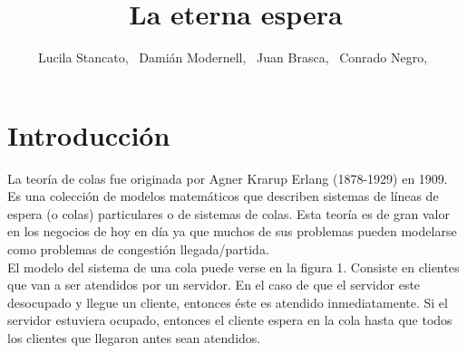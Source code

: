 \documentclass[10pt,journal,compsoc]{IEEEtran}
\begin{document}
\title{La eterna espera}


\author{Lucila Stancato,~
		Dami\'an Modernell,~
		Juan Brasca,~
		Conrado Negro,~%
}


\maketitle

\IEEEdisplaynotcompsoctitleabstractindextext

\IEEEpeerreviewmaketitle

\section{Introducci\'on} %
La teor\'ia de colas fue originada por Agner Krarup Erlang (1878-1929) en 1909. Es una colecci\'on
de modelos matem\'aticos que describen sistemas de l\'ineas de espera (o colas) particulares o de
sistemas de colas. Esta teor\'ia es de gran valor en los negocios de hoy en d\'ia ya que muchos de
sus problemas pueden modelarse como problemas de congesti\'on llegada/partida.\\
El modelo del sistema de una cola puede verse en la figura 1. Consiste en clientes que van a ser
atendidos por un servidor. En el caso de que el servidor este desocupado y llegue un cliente, entonces
\'este es atendido inmediatamente. Si el servidor estuviera ocupado, entonces el cliente espera en la
cola hasta que todos los clientes que llegaron antes sean atendidos.\\
\end{document}
